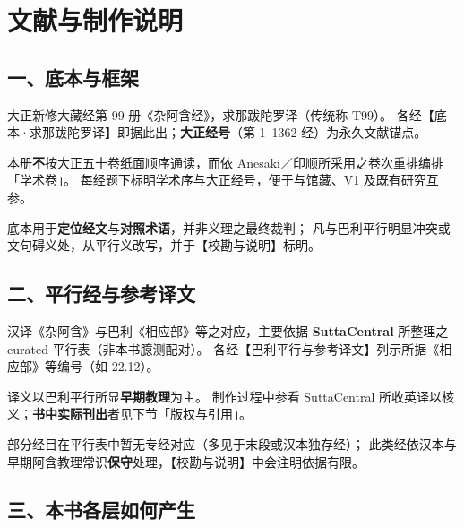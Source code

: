 
\chapter*{文献与制作说明}

\section*{一、底本与框架}

\begin{description}[style=nextline,leftmargin=3.2em]
  \item[汉译底本]
  大正新修大藏经第 99 册《杂阿含经》，求那跋陀罗译（传统称 T99）。
  各经【底本·求那跋陀罗译】即据此出；\textbf{大正经号}（第 1--1362 经）为永久文献锚点。
  \item[卷次与品目]
  本册\textbf{不}按大正五十卷纸面顺序通读，而依 Anesaki／印顺所采用之卷次重排编排「学术卷」。
  每经题下标明学术序与大正经号，便于与馆藏、V1 及既有研究互参。
  \item[底本地位]
  底本用于\textbf{定位经文}与\textbf{对照术语}，并非义理之最终裁判；
  凡与巴利平行明显冲突或文句碍义处，从平行义改写，并于【校勘与说明】标明。
\end{description}

\section*{二、平行经与参考译文}

\begin{description}[style=nextline,leftmargin=3.2em]
  \item[平行关系]
  汉译《杂阿含》与巴利《相应部》等之对应，主要依据
  \textbf{SuttaCentral} 所整理之 curated 平行表（非本书臆测配对）。
  各经【巴利平行与参考译文】列示所据《相应部》等编号（如 22.12）。
  \item[义理裁判]
  译义以巴利平行所显\textbf{早期教理}为主。
  制作过程中参看 SuttaCentral 所收英译以核义；\textbf{书中实际刊出}者见下节「版权与引用」。
  \item[无平行时]
  部分经目在平行表中暂无专经对应（多见于末段或汉本独存经）；
  此类经依汉本与早期阿含教理常识\textbf{保守}处理，【校勘与说明】中会注明依据有限。
\end{description}

\section*{三、本书各层如何产生}

